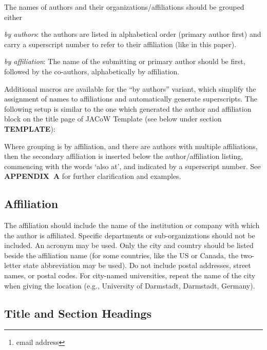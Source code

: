 \documentclass[%
               hyphens,       %
               ]{jacow}
\begin{document}
The names of authors and their organizations/affiliations should be grouped either
\begin{Itemize}
	\item \textit{by authors}: the authors are listed in alphabetical order (primary author first) and carry a superscript 
			number to refer to their affiliation (like in this paper).
	\item \textit{by affiliation}: The name of the submitting or primary author should be first, followed by the co-authors, 
			alphabetically by affiliation. 
\end{Itemize}

Additional macros are available for the “by authors” variant, which simplify the assignment of names to affiliations and automatically generate superscripts. The following setup is similar to the one which generated the author and affiliation block on the title page of JACoW Template (see below under section \textbf{TEMPLATE}):
\begin{Tverb}
\author[1]{A. N. Author\thanks{email address}}
\author[1,2]{B. Coauthor}
\author[2,3]{C. Contributor}
\end{Tverb}

Where grouping is by affiliation, and there are authors with multiple affiliations, 
then the secondary affiliation is inserted below the author/affiliation listing, 
commencing with the words ‘also at’, and indicated by a superscript number. 
See \textbf{APPENDIX~A} for further clarification and examples.

\subsection{Affiliation}

The affiliation should include the name of the institution or company with which the author is affiliated. 
Specific departments or sub-organizations should not be included. An acronym may be used. 
Only the city and country should be listed beside the affiliation name (for some countries, like the US or Canada, the two-letter state abbreviation may be used). Do not include postal addresses, street names, or postal codes. For city-named universities, repeat the name of the city when giving the location (e.g., University of Darmstadt, Darmstadt, Germany).

\subsection{Title and Section Headings}
\end{document}
